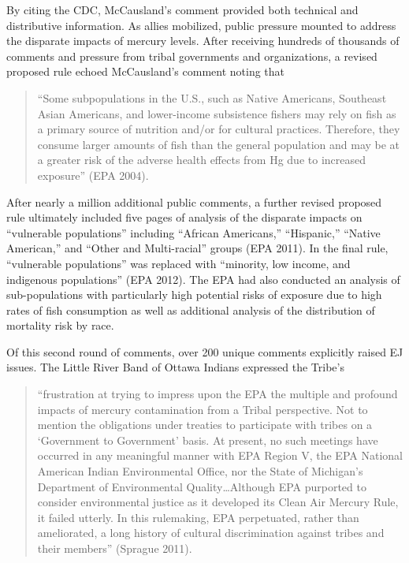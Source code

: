 \documentclass[
      12pt,
        ]{article}
\begin{document}
By citing the CDC, McCausland's comment provided both technical and distributive information. As allies mobilized, public pressure mounted to address the disparate impacts of mercury levels.
After receiving hundreds of thousands of comments and pressure from
tribal governments and organizations, a revised proposed rule echoed McCausland's
comment noting that

\begin{quote}
``Some subpopulations in the U.S., such as Native
Americans, Southeast Asian Americans, and lower-income subsistence
fishers may rely on fish as a primary source of nutrition and/or for
cultural practices. Therefore, they consume larger amounts of fish than
the general population and may be at a greater risk of the adverse
health effects from Hg due to increased exposure'' (EPA 2004).
\end{quote}

After nearly a million additional public comments, a further revised proposed
rule ultimately included five pages of analysis of the disparate impacts
on ``vulnerable populations'' including ``African Americans,'' ``Hispanic,''
``Native American,'' and ``Other and Multi-racial'' groups (EPA 2011). In the final rule, ``vulnerable populations'' was replaced
with ``minority, low income, and indigenous populations'' (EPA 2012). The EPA
had also conducted an analysis of sub-populations with particularly high
potential risks of exposure due to high rates of fish consumption as well
as additional analysis of the distribution of mortality risk by
race.

Of this second round of comments, over 200 unique comments explicitly raised
EJ issues. The Little River Band of Ottawa Indians
expressed the Tribe's

\begin{quote}
``frustration at trying to impress upon the EPA the
multiple and profound impacts of mercury contamination from a Tribal
perspective. Not to mention the obligations under treaties to
participate with tribes on a `Government to Government' basis. At
present, no such meetings have occurred in any meaningful manner with
EPA Region V, the EPA National American Indian Environmental Office, nor
the State of Michigan's Department of Environmental Quality\ldots Although EPA purported to consider environmental justice
as it developed its Clean Air Mercury Rule, it failed utterly. In this
rulemaking, EPA perpetuated, rather than ameliorated, a long history of
cultural discrimination against tribes and their members'' (Sprague
2011).
\end{quote}
\end{document}
